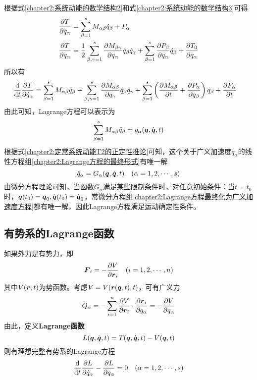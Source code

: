 根据式\eqref{chapter2:系统动能的数学结构2}和式\eqref{chapter2:系统动能的数学结构3}可得
\begin{align*}
	\frac{\partial T}{\partial \dot{q}_\alpha} & = \sum_{\beta=1}^s M_{\alpha\beta} \dot{q}_\beta + P_\alpha \\
	\frac{\partial T}{\partial q_\alpha} & = \frac12 \sum_{\beta,\gamma=1}^s \frac{\partial M_{\beta\gamma}}{\partial q_\alpha} \dot{q}_\beta \dot{q}_\gamma + \sum_{\beta=1}^s \frac{\partial P_\beta}{\partial q_\alpha} \dot{q}_\beta + \frac{\partial T_0}{\partial q_\alpha}
\end{align*}
所以有
\begin{align*}
	\frac{\mathrm{d}}{\mathrm{d} t} \frac{\partial T}{\partial \dot{q}_\alpha} & = \sum_{\beta=1}^s M_{\alpha\beta} \ddot{q}_\beta + \sum_{\beta,\gamma=1}^s \frac{\partial M_{\alpha\beta}}{\partial q_\gamma} \dot{q}_\beta \dot{q}_\gamma + \sum_{\beta=1}^s \left(\frac{\partial M_{\alpha\beta}}{\partial t} + \frac{\partial P_\alpha}{\partial q_\beta}\right) \dot{q}_\beta + \frac{\partial P_\alpha}{\partial t}
\end{align*}
由此可知，Lagrange方程可以表示为
\begin{equation}
	\sum_{\beta=1}^s M_{\alpha\beta}\ddot{q}_\beta = g_\alpha(\boldsymbol{q},\dot{\boldsymbol{q}},t)
	\label{chapter2:Lagrange方程的最终形式}
\end{equation}
根据式\eqref{chapter2:定常系统动能T2的正定性推论}可知，这个关于广义加速度$\ddot{q}_\alpha$的线性方程组\eqref{chapter2:Lagrange方程的最终形式}有唯一解
\begin{equation}
	\ddot{q}_\alpha = G_\alpha(\boldsymbol{q},\dot{\boldsymbol{q}},t)\quad (\alpha=1,2,\cdots,s)
	\label{chapter2:Lagrange方程最终化为广义加速度方程}
\end{equation}
由微分方程理论可知，当函数$G_\alpha$满足某些限制条件时，对任意初始条件：当$t=t_0$时，$\boldsymbol{q}(t_0)=\boldsymbol{q}_0, \dot{\boldsymbol{q}}(t_0) = \dot{\boldsymbol{q}}_0$，常微分方程组\eqref{chapter2:Lagrange方程最终化为广义加速度方程}都有唯一解，因此Lagrange方程满足运动确定性条件。

\subsection{有势系的Lagrange函数}

如果外力是有势力，即
\begin{equation}
	\boldsymbol{F}_i = -\frac{\partial V}{\partial \boldsymbol{r}_i}\quad (i = 1,2,\cdots,n)
\end{equation}
其中$V(\boldsymbol{r},t)$为势函数。考虑$V = V(\boldsymbol{r}(\boldsymbol{q},t),t)$，可有广义力
\begin{equation}
	Q_\alpha = -\sum_{i=1}^n \frac{\partial V}{\partial \boldsymbol{r}_i} \cdot \frac{\partial \boldsymbol{r}_i}{\partial q_\alpha} = -\frac{\partial V}{\partial q_\alpha}
\end{equation}
由此，定义{\bf Lagrange函数}
\begin{equation}
	L(\boldsymbol{q},\dot{\boldsymbol{q}},t) = T(\boldsymbol{q},\dot{\boldsymbol{q}},t) - V(\boldsymbol{q},t)
	\label{Lagrange函数}
\end{equation}
则有{\heiti 理想完整有势系的Lagrange方程}
\begin{equation}
	\frac{\mathrm{d}}{\mathrm{d} t} \frac{\partial L}{\partial \dot{q}_\alpha} - \frac{\partial L}{\partial q_\alpha} = 0 \quad (\alpha =1,2,\cdots,s)
	\label{理想完整有势系的Lagrange方程}
\end{equation}


